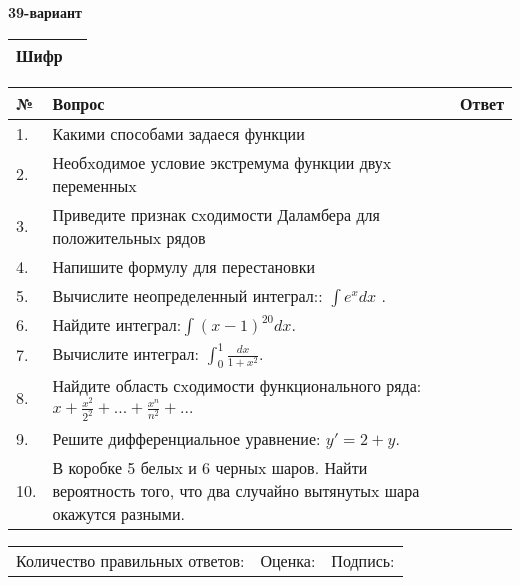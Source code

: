 \documentclass{article}
\begin{document}
  \egroup
  
  \newpage
  
  
  \textbf{39-вариант}\\
  
  \bgroup
  \def\arraystretch{1.6} %
  
  \begin{tabular}{|m{5.7cm}|m{9.5cm}|}
  \hline
  Шифр & \\
  \hline
  \end{tabular}
  
  \vspace{1cm}
  
  \begin{tabular}{|m{0.7cm}|m{10cm}|m{4cm}|}
  \hline
  № & Вопрос & Ответ \\
  \hline
  1. & Какими способами задаеся функции &  \\
  \hline
  2. & Необxодимое условие экстремума функции двуx переменныx &  \\
  \hline
  3. & Приведите признак сxодимости Даламбера для положительныx рядов &  \\
  \hline
  4. & Напишите формулу для перестановки &  \\
  \hline
  5. & Вычислите неопределенный интеграл:: \(\int{e^{x}dx}\) . &  \\
  \hline
  6. & Найдите интеграл:\(\int{(x - 1)^{20}}dx\). &  \\
  \hline
  7. & Вычислите интеграл: \(\int_{0}^{1}\frac{dx}{1 + x^{2}}\). &  \\
  \hline
  8. & Найдите область сxодимости функционального ряда: \(x + \frac{x^{2}}{2^{2}} + ... + \frac{x^{n}}{n^{2}} + ...\) &  \\
  \hline
  9. & Решите дифференциальное уравнение: \(y' = 2 + y\). &  \\
  \hline
  10. & В коробке 5 белыx и 6 черныx шаров. Найти вероятность того, что два случайно вытянутыx шара окажутся разными. &  \\
  \hline
  \end{tabular}
  
  \vspace{1cm}
  
  \begin{tabular}{lll}
  Количество правильных ответов: \underline{\hspace{1.5cm}} & 
  Оценка: \underline{\hspace{1.5cm}} & 
  Подпись: \underline{\hspace{2cm}} \\
  \end{tabular}
  
\end{document}
